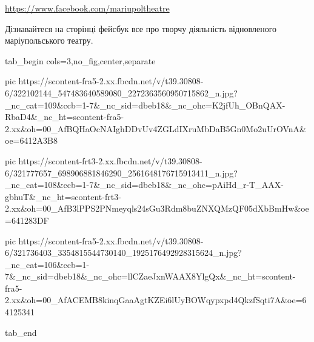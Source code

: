 
\url{https://www.facebook.com/mariupoltheatre}

Дізнавайтеся на сторінці фейсбук все про творчу діяльність відновленого
маріупольського театру.

\begin{center}
\begin{minipage}{\textwidth}

\ifcmt
  tab_begin cols=3,no_fig,center,separate

     pic https://scontent-fra5-2.xx.fbcdn.net/v/t39.30808-6/322102144_547483640589080_2272363560950715862_n.jpg?_nc_cat=109&ccb=1-7&_nc_sid=dbeb18&_nc_ohc=K2jfUh_OBnQAX-RbaD4&_nc_ht=scontent-fra5-2.xx&oh=00_AfBQHaOcNAIghDDvUv4ZGLdIXruMbDaB5Gn0Mo2uUrOVnA&oe=6412A3B8

     pic https://scontent-frt3-2.xx.fbcdn.net/v/t39.30808-6/321777657_698906881846290_2561648176715913411_n.jpg?_nc_cat=108&ccb=1-7&_nc_sid=dbeb18&_nc_ohc=pAiHd_r-T_AAX-gbhuT&_nc_ht=scontent-frt3-2.xx&oh=00_AfB3lPPS2PNmeyqls24sGu3Rdm8buZNXQMzQF05dXbBmHw&oe=641283DF

     pic https://scontent-fra5-2.xx.fbcdn.net/v/t39.30808-6/321736403_3354815544730140_1925176492928315624_n.jpg?_nc_cat=106&ccb=1-7&_nc_sid=dbeb18&_nc_ohc=llCZaeJxnWAAX8YlgQx&_nc_ht=scontent-fra5-2.xx&oh=00_AfACEMB8kinqGaaAgtKZEi6lUyBOWqypxpd4QkzfSqti7A&oe=64125341

  tab_end
\fi

\end{minipage}
\end{center}
